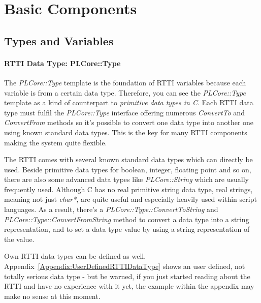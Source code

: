 \section{Basic Components}




\subsection{Types and Variables}
\paragraph{RTTI Data Type: PLCore::Type}
The \emph{PLCore::Type} template is the foundation of RTTI variables because each variable is from a certain data type. Therefore, you can see the \emph{PLCore::Type} template as a kind of counterpart to \emph{primitive data types in C}. Each RTTI data type must fulfil the \emph{PLCore::Type} interface offering numerous \emph{ConvertTo} and \emph{ConvertFrom} methods so it's possible to convert one data type into another one using known standard data types. This is the key for many RTTI components making the system quite flexible.

The RTTI comes with several known standard data types which can directly be used. Beside primitive data types for boolean, integer, floating point and so on, there are also some advanced data types like \emph{PLCore::String} which are usually frequently used. Although C has no real primitive string data type, real strings, meaning not just \emph{char*}, are quite useful and especially heavily used within script languages. As a result, there's a \emph{PLCore::Type::ConvertToString} and \emph{PLCore::Type::ConvertFromString} method to convert a data type into a string representation, and to set a data type value by using a string representation of the value.

Own RTTI data types can be defined as well. Appendix~\ref{Appendix:UserDefinedRTTIDataType} shows an user defined, not totally serious data type - but be warned, if you just started reading about the RTTI and have no experience with it yet, the example within the appendix may make no sense at this moment.


